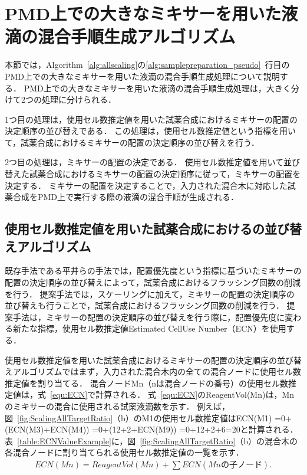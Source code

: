 \section{PMD上での大きなミキサーを用いた液滴の混合手順生成アルゴリズム}\label{sec:GenerateProcedure}

本節では，Algorithm~\ref{alg:allscaling}の\ref{alg:samplepreparation_pseudo}~行目のPMD上での大きなミキサーを用いた液滴の混合手順生成処理について説明する．
PMD上での大きなミキサーを用いた液滴の混合手順生成処理は，大きく分けて2つの処理に分けられる．

1つ目の処理は，使用セル数推定値を用いた試薬合成におけるミキサーの配置の決定順序の並び替えである．
この処理は，使用セル数推定値という指標を用いて，試薬合成におけるミキサーの配置の決定順序の並び替えを行う．

2つ目の処理は，ミキサーの配置の決定である．
使用セル数推定値を用いて並び替えた試薬合成におけるミキサーの配置の決定順序に従って，ミキサーの配置を決定する．
ミキサーの配置を決定することで，入力された混合木に対応した試薬合成をPMD上で実行する際の液滴の混合手順が生成される．

\subsection{使用セル数推定値を用いた試薬合成におけるの並び替えアルゴリズム}\label{sec:ECN}
既存手法である平井らの手法では，配置優先度という指標に基づいたミキサーの配置の決定順序の並び替えによって，試薬合成におけるフラッシング回数の削減を行う．
提案手法では，スケーリングに加えて，ミキサーの配置の決定順序の並び替えも行うことで，試薬合成におけるフラッシング回数の削減を行う．
提案手法は，ミキサーの配置の決定順序の並び替えを行う際に，配置優先度に変わる新たな指標，使用セル数推定値Estimated CellUse Number（ECN）を使用する．

使用セル数推定値を用いた試薬合成におけるミキサーの配置の決定順序の並び替えアルゴリズムではまず，入力された混合木内の全ての混合ノードに使用セル数推定値を割り当てる．
混合ノードMn（nは混合ノードの番号）の使用セル数推定値は，式~\ref{equ:ECN}で計算される．
式~\ref{equ:ECN}のReagentVol(Mn)は，Mnのミキサーの混合に使用される試薬液滴数を示す．
例えば，図~\ref{fig:ScalingAllTargetRatio}（b）のM1の使用セル数推定値はECN(M1) =0+(ECN(M3)+ECN(M4)) =0+(12+2+ECN(M9)) =0+12+2+6=20と計算される．
表~\ref{table:ECNValueExample}に，図~\ref{fig:ScalingAllTargetRatio}（b）の混合木の各混合ノードに割り当てられる使用セル数推定値の一覧を示す．
\begin{align}
    ECN(Mn)= ReagentVol(Mn) + \sum ECN(Mnの子ノード).
\label{equ:ECN}
\end{align}

